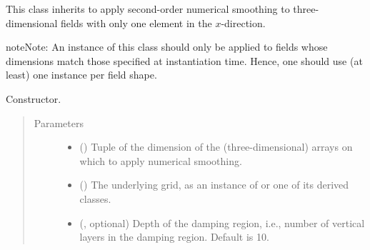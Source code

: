 \documentclass[letterpaper,10pt,english]{sphinxmanual}
\begin{document}
\begin{fulllineitems}
\label{\detokenize{api:dycore.horizontal_smoothing.HorizontalSmoothingSecondOrderYZ}}
This class inherits {\hyperref[\detokenize{api:dycore.horizontal_smoothing.HorizontalSmoothing}]{}} to apply second-order numerical smoothing to
three-dimensional fields with only one element in the \(x\)-direction.

\begin{sphinxadmonition}{note}{Note:}
An instance of this class should only be applied to fields whose dimensions match those specified at instantiation time.
Hence, one should use (at least) one instance per field shape.
\end{sphinxadmonition}

\begin{fulllineitems}
\label{\detokenize{api:dycore.horizontal_smoothing.HorizontalSmoothingSecondOrderYZ.__init__}}
Constructor.
\begin{quote}\begin{description}
\item[{Parameters}] \leavevmode\begin{itemize}
\item {} 
 () \textendash{} Tuple of the dimension of the (three-dimensional) arrays on which to apply numerical smoothing.

\item {} 
 () \textendash{} The underlying grid, as an instance of {\hyperref[\detokenize{api:grids.grid_xyz.GridXYZ}]{}} or one of its derived classes.

\item {} 
 (, optional) \textendash{} Depth of the damping region, i.e., number of vertical layers in the damping region. Default is 10.


\end{itemize}
\end{description}
\end{quote}
\end{fulllineitems}
\end{fulllineitems}
\end{document}
